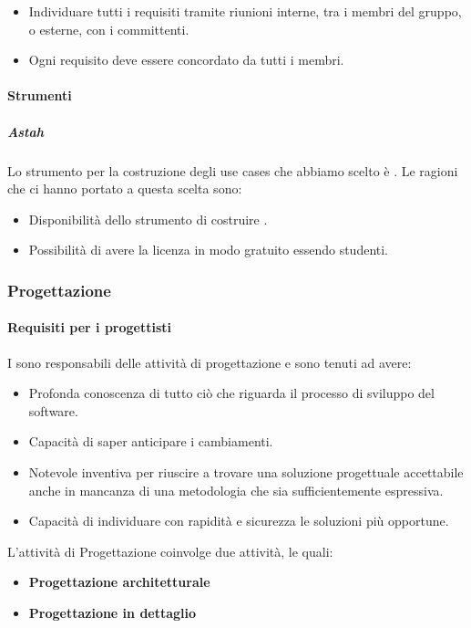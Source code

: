 \begin{itemize}
\item Individuare tutti i requisiti tramite riunioni interne, tra i membri del gruppo, o esterne, con i committenti.
\item Ogni requisito deve essere concordato da tutti i membri.
\end{itemize}

\paragraph{Strumenti}

\subparagraph{Astah}
Lo strumento per la costruzione degli use cases che abbiamo scelto è .
Le ragioni che ci hanno portato a questa scelta sono:
\begin{itemize}
\item Disponibilità dello strumento di costruire .
\item Possibilità di avere la licenza in modo gratuito essendo studenti.
\end{itemize}



\subsubsection{Progettazione}

\paragraph{Requisiti per i progettisti}
I \textit{\ProgP} sono responsabili delle attività di progettazione e sono tenuti ad avere:
\begin{itemize}
\item
Profonda conoscenza di tutto ciò che riguarda il processo di sviluppo del software.
\item
Capacità di saper anticipare i cambiamenti.
\item
Notevole inventiva per riuscire a trovare una soluzione progettuale accettabile anche in mancanza di una metodologia che sia sufficientemente espressiva.
\item
Capacità di individuare con rapidità e sicurezza le soluzioni più opportune.
\end{itemize}

L'attività di Progettazione coinvolge due attività, le quali:
\begin{itemize}
\item \textbf{Progettazione architetturale}
\item \textbf{Progettazione in dettaglio}
\end{itemize}

